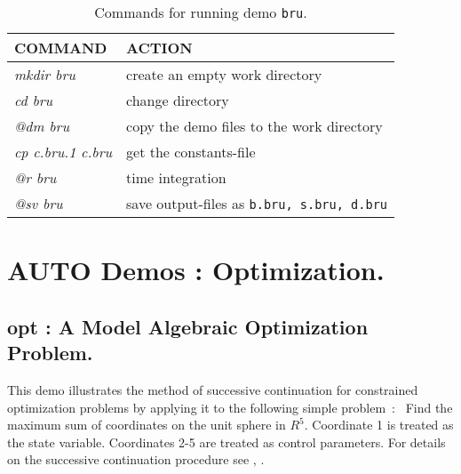 \documentclass[12pt]{report}
\begin{document}
\begin{table}[htbp]
\begin{center}
\begin{tabular}{| l | l |}
\hline
  COMMAND  & ACTION \\
\hline
  {\it mkdir bru} & create an empty work directory \\ 
  {\it cd bru} & change directory \\
  {\it @dm bru} & copy the demo files to the work directory \\
\hline
  {\it cp c.bru.1 c.bru} & get the constants-file \\ 
  {\it @r bru} & time integration \\ 
  {\it @sv bru} & save output-files as {\tt b.bru, s.bru, d.bru} \\ 
\hline
\end{tabular}
\caption{Commands for running demo {\tt bru}.}
\label{tbl:demo_bru}
\end{center}
\end{table}

\chapter{ {\cal AUTO} Demos : Optimization.} \label{ch:Demos_Opt}

\newpage
\section{ opt : A Model Algebraic Optimization Problem.} \label{sec:Demos_opt}
This demo illustrates the method of successive continuation 
for constrained optimization problems 
 by applying it to the following
simple problem~:~
Find the
maximum sum of coordinates on the unit sphere in $R^{5}$.
Coordinate 1 is treated as the state variable.
Coordinates 2-5 are treated as control parameters.
For details on the successive continuation procedure
see   \citeyear{DoKeKe:91a},
 \citeyear{DoKeKe:91b}.
\end{document}
